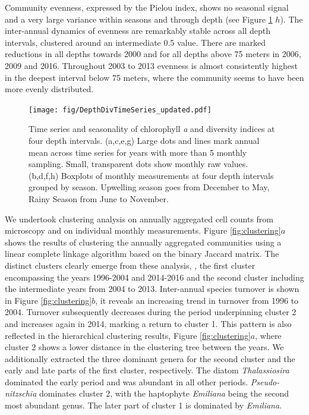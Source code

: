 \documentclass[draft]{agujournal2019}
\begin{document}
Community evenness, expressed by the Pielou index, shows no seasonal signal and a very large variance within seasons and through depth (see Figure \ref{fig:divts} $h$). The inter-annual dynamics of evenness are remarkably stable across all depth intervals, clustered around an intermediate 0.5 value. There are marked reductions in all depths towards 2000 and for all depths above 75 meters in 2006, 2009 and 2016. Throughout 2003 to 2013 evenness is almost consistently highest in the deepest interval below 75 meters, where the community seems to have been more evenly distributed. 


\begin{figure}
\begin{center}
\noindent\texttt{[image: fig/DepthDivTimeSeries\_updated.pdf]}
\end{center}
\caption{Time series and seasonality of chlorophyll \textit{a} and diversity indices at four depth intervals. (a,c,e,g) Large dots and lines mark annual mean across time series for years with more than 5 monthly sampling. Small, transparent dots show monthly raw values. (b,d,f,h) Boxplots of monthly measurements at four depth intervals grouped by season. Upwelling season goes from December to May, Rainy Season from June to November.}
\label{fig:divts}
\end{figure}


We undertook clustering analysis on annually aggregated cell counts from microscopy and on individual monthly measurements. Figure \ref{fig:clustering}$a$ shows the results of clustering the annually aggregated communities using a linear complete linkage algorithm based on the binary Jaccard matrix. The distinct clusters clearly emerge from these analysis, , the first cluster encompassing the years 1996-2004 and 2014-2016 and the second cluster including the intermediate years from 2004 to 2013. 
Inter-annual species turnover is shown in Figure \ref{fig:clustering}$b$, it reveals an increasing trend in turnover from 1996 to 2004. Turnover subsequently decreases during the period underpinning cluster 2 and increases again in 2014, marking a return to cluster 1. This pattern is also reflected in the hierarchical clustering results, Figure \ref{fig:clustering}$a$, where cluster 2 shows a lower distance in the clustering tree between the years. We additionally extracted the three dominant genera for the second cluster and the early and late parts of the first cluster, respectively. The diatom \textit{Thalassiosira} dominated the early period and was abundant in all other periods. \textit{Pseudo-nitzschia} dominates cluster 2, with the haptophyte \textit{Emiliana} being the second most abundant genus. The later part of cluster 1 is dominated by \textit{Emiliana}. 
\end{document}
